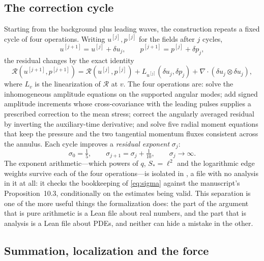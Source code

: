 \subsection{The correction cycle}
\label{sec:correction}

Starting from the background plus leading waves, the construction repeats a fixed cycle of
four operations. Writing $u^{[j]},p^{[j]}$ for the fields after $j$ cycles,
\begin{equation}
  u^{[j+1]} = u^{[j]} + \delta u_j,
  \qquad
  p^{[j+1]} = p^{[j]} + \delta p_j,
\end{equation}
the residual changes by the exact identity
\begin{equation}
  \mathcal{R}(u^{[j+1]},p^{[j+1]}) = \mathcal{R}(u^{[j]},p^{[j]})
   + L_{u^{[j]}}(\delta u_j,\delta p_j) + \nabla\cdot(\delta u_j\otimes\delta u_j),
  \label{eq:increment}
\end{equation}
where $L_v$ is the linearization of $\mathcal{R}$ at $v$. The four operations are: solve the
inhomogeneous amplitude equations on the supported angular modes; add signed amplitude
increments whose cross-covariance with the leading pulses supplies a prescribed correction
to the mean stress; correct the angularly averaged residual by inverting the auxiliary-time
derivative; and solve five radial moment equations that keep the pressure and the two
tangential momentum fluxes consistent across the annulus. Each cycle improves a
\emph{residual exponent} $\sigma_j$:
\begin{equation}
  \sigma_0=\tfrac15,\qquad \sigma_{j+1}=\sigma_j+\tfrac1{10},
  \qquad \sigma_j \longrightarrow \infty .
  \label{eq:sigma}
\end{equation}
The exponent arithmetic---which powers of $q$, $S_*=\ell^2$ and the logarithmic edge
weights survive each of the four operations---is isolated in
, a file with no analysis in it at all: it checks the
bookkeeping of \eqref{eq:sigma} against the manuscript's Proposition~10.3, conditionally on
the estimates being valid. This separation is one of the more useful things the
formalization does: the part of the argument that is pure arithmetic is a Lean file about
real numbers, and the part that is analysis is a Lean file about PDEs, and neither can hide
a mistake in the other.

\subsection{Summation, localization and the force}
\label{sec:summation}

